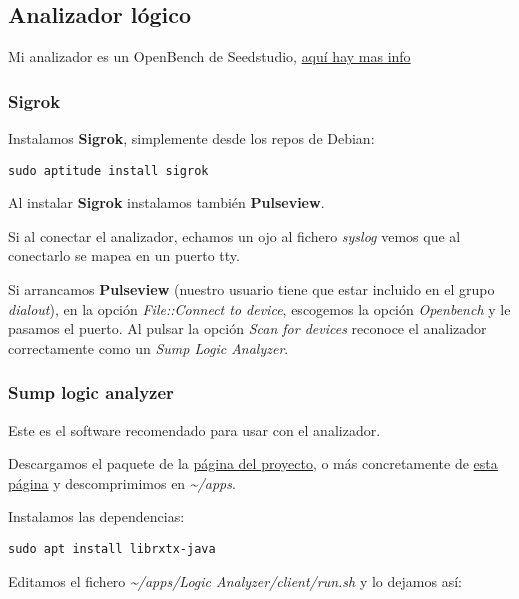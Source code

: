 \documentclass[
  12pt,
  spanish,
]{article}
\begin{document}
\hypertarget{analizador-luxf3gico}{%
\subsection{Analizador lógico}\label{analizador-luxf3gico}}

Mi analizador es un OpenBench de Seedstudio,
\href{http://dangerousprototypes.com/docs/Open_Bench_Logic_Sniffer}{aquí
hay mas info}

\hypertarget{sigrok}{%
\subsubsection{Sigrok}\label{sigrok}}

Instalamos \textbf{Sigrok}, simplemente desde los repos de Debian:

\begin{verbatim}
sudo aptitude install sigrok
\end{verbatim}

Al instalar \textbf{Sigrok} instalamos también \textbf{Pulseview}.

Si al conectar el analizador, echamos un ojo al fichero \emph{syslog}
vemos que al conectarlo se mapea en un puerto tty.

Si arrancamos \textbf{Pulseview} (nuestro usuario tiene que estar
incluido en el grupo \emph{dialout}), en la opción \emph{File::Connect
to device}, escogemos la opción \emph{Openbench} y le pasamos el puerto.
Al pulsar la opción \emph{Scan for devices} reconoce el analizador
correctamente como un \emph{Sump Logic Analyzer}.

\hypertarget{sump-logic-analyzer}{%
\subsubsection{Sump logic analyzer}\label{sump-logic-analyzer}}

Este es el software recomendado para usar con el analizador.

Descargamos el paquete de la \href{https://www.sump.org}{página del
proyecto}, o más concretamente de
\href{https://www.sump.org/projects/analyzer/}{esta página} y
descomprimimos en \emph{\textasciitilde/apps}.

Instalamos las dependencias:

\begin{verbatim}
sudo apt install librxtx-java
\end{verbatim}

Editamos el fichero \emph{\textasciitilde/apps/Logic
Analyzer/client/run.sh} y lo dejamos así:
\end{document}
